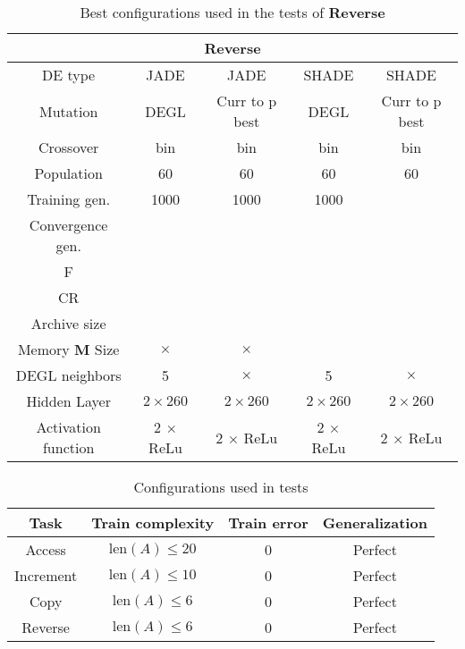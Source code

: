 \begin{table}[]
	\centering
	\begin{tabular}{|c|c|c|c|c|}
		\hline
		\multicolumn{5}{|c|}{\textbf{Reverse}} \\ \hline
		DE type & JADE & JADE & SHADE & SHADE \\ \hline
		Mutation & DEGL & Curr to p best & DEGL & Curr to p best  \\ \hline
		Crossover & bin & bin & bin & bin \\ \hline
		Population & 60 & 60 & 60 & 60 \\ \hline
		Training gen. & 1000 & 1000 & 1000 & \\ \hline
		Convergence gen. & & & & \\ \hline
		F & & & & \\ \hline
		CR & & & & \\ \hline
		Archive size & & & & \\ \hline
		Memory \textbf{M} Size & $\times$ & $\times$ & & \\ \hline
		DEGL neighbors & 5 & $\times$ & 5 & $\times$ \\ \hline
		Hidden Layer & $2 \times 260$ & $2 \times 260$ & $2 \times 260$ &  $2 \times 260$\\ \hline
		Activation function & 2 $\times$ ReLu & 2 $\times$ ReLu & 2 $\times$ ReLu & 2 $\times$ ReLu \\ \hline
	\end{tabular}
	\caption{Best configurations used in the tests of \textbf{Reverse}}
	\label{tbl:tests-configurations-reverse}
\end{table}

\begin{table}[]
\centering
\label{my-label} 
\begin{tabular}{|c|c|c|c|}
\hline
\textbf{Task} & \textbf{Train complexity} & \textbf{Train error} & \textbf{Generalization} \\ \hline

Access & $\textrm{len}(A) \leq 20$ & 0 & Perfect \\ \hline
Increment & $\textrm{len}(A) \leq 10$ & 0 & Perfect \\ \hline
Copy & $\textrm{len}(A) \leq 6$ & 0 & Perfect \\ \hline
Reverse & $\textrm{len}(A) \leq 6$ & 0 & Perfect \\ \hline

\end{tabular}
\caption{Configurations used in tests}
\label{tbl:tests-configuration}
\end{table}

